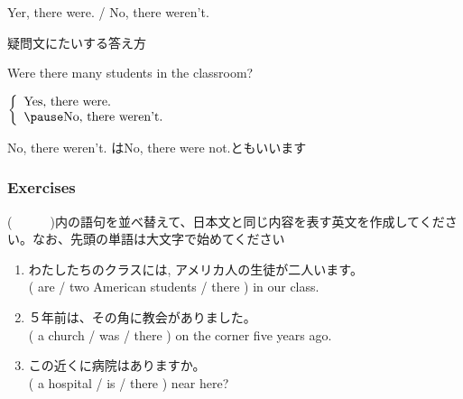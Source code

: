 \documentclass[aspectratio=169]{beamer}
\newcommand{\myaudio}[1]{\href{#1}{\faVolumeUp}}
\begin{document}
 \begin{frame}[plain]{Yer, there were. / No, there weren't.}
 \Large

疑問文にたいする答え方\hfill\myaudio{./audio/001_there_is_12.mp3}
\vspace{10pt}

\pause

Were there many students in the classroom?

\pause

$\left\{\begin{array}{l}
	 \text{Yes, there were.}\\\pause
         \text{No, there weren't.}
	\end{array}\right.$

\pause

\mbox{}\hfill{}{\small No, there weren't. はNo, there were not.ともいいます}
\end{frame}
\begin{frame}[plain]\frametitle{Exercises}
(~~~~~~)内の語句を並べ替えて、日本文と同じ内容を表す英文を作成してください。なお、先頭の単語は大文字で始めてください\pause

  \begin{enumerate}
   \item わたしたちのクラスには,
アメリカ人の生徒が二人います。\\
         \pause
         ( are / two American students / there ) in our class.\\
         \pause
         \pause
   \item ５年前は、その角に教会がありました。\\
         \pause
         ( a church / was / there ) on the corner five years ago.\\
         \pause
         \pause
   \item この近くに病院はありますか。\\
         \pause
         ( a hospital / is / there ) near here?\\
         \pause
  \end{enumerate}



\hfill\myaudio{./audio/001_there_is_13.mp3}
\end{frame}
\end{document}
